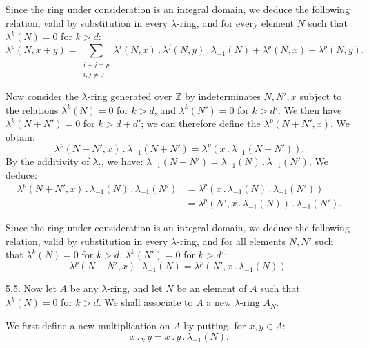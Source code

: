 Since the ring under consideration is an integral domain, we deduce the following relation, valid by substitution in every \(\lambda\)-ring, and for every element \(N\) such that \(\lambda^k(N)=0\) for \(k>d\):
\begin{equation}\tag{5.4.1}
  \lambda^p(N,x+y)=\sum_{\substack{i+j=p\\ i,j\ne0}}\lambda^i(N,x)\mathbin{.}\lambda^j(N,y)\mathbin{.}\lambda_{-1}(N)+\lambda^p(N,x)+\lambda^p(N,y).
\end{equation}

Now consider the \(\lambda\)-ring generated over \(\mathbb Z\) by indeterminates \(N,N',x\) subject to the relations \(\lambda^k(N)=0\) for \(k>d\), and \(\lambda^k(N')=0\) for \(k>d'\). We then have \(\lambda^k(N+N')=0\) for \(k>d+d'\); we can therefore define the \(\lambda^p(N+N',x)\). We obtain:
\[
  \lambda^p(N+N',x)\mathbin{.}\lambda_{-1}(N+N')=\lambda^p(x\mathbin{.}\lambda_{-1}(N+N')).
\]
By the additivity of \(\lambda_t\), we have: \(\lambda_{-1}(N+N')=\lambda_{-1}(N)\mathbin{.}\lambda_{-1}(N')\). We deduce:
\begin{align*}
  \lambda^p(N+N',x)\mathbin{.}\lambda_{-1}(N)\mathbin{.}\lambda_{-1}(N')
  &=\lambda^p(x\mathbin{.}\lambda_{-1}(N)\mathbin{.}\lambda_{-1}(N'))\\
  &=\lambda^p(N',x\mathbin{.}\lambda_{-1}(N))\mathbin{.}\lambda_{-1}(N').
\end{align*}

%
Since the ring under consideration is an integral domain, we deduce the following relation, valid by substitution in every \(\lambda\)-ring, and for all elements \(N,N'\) such that \(\lambda^k(N)=0\) for \(k>d\), \(\lambda^k(N')=0\) for \(k>d'\);
\begin{equation}\tag{5.4.2}
  \lambda^p(N+N',x)\mathbin{.}\lambda_{-1}(N)=\lambda^p(N',x\mathbin{.}\lambda_{-1}(N)).
\end{equation}

5.5. Now let \(A\) be any \(\lambda\)-ring, and let \(N\) be an element of \(A\) such that \(\lambda^k(N)=0\) for \(k>d\). We shall associate to \(A\) a new \(\lambda\)-ring \(A_N\).

We first define a new multiplication on \(A\) by putting, for \(x,y\in A\):
\begin{equation}\tag{5.5.1}
  x\mathbin{.}_N y=x\mathbin{.} y\mathbin{.}\lambda_{-1}(N).
\end{equation}

